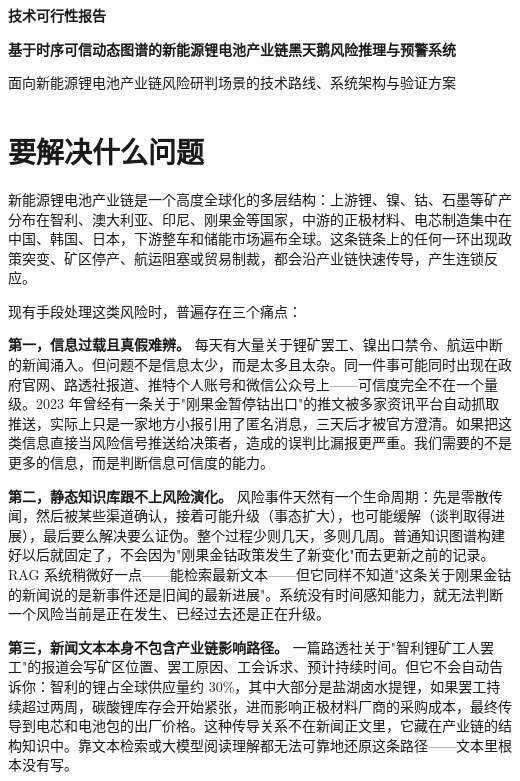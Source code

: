 \documentclass[12pt,a4paper]{ctexart}
\begin{document}
\begin{center}
    \vspace*{0.8cm}
    {\bfseries 技术可行性报告\par}
    \vspace{0.8cm}
    {\bfseries 基于时序可信动态图谱的新能源锂电池产业链黑天鹅风险推理与预警系统\par}
    \vspace{0.5cm}
    { 面向新能源锂电池产业链风险研判场景的技术路线、系统架构与验证方案\par}
\end{center}

\vspace{0.6cm}

\section{要解决什么问题}

新能源锂电池产业链是一个高度全球化的多层结构：上游锂、镍、钴、石墨等矿产分布在智利、澳大利亚、印尼、刚果金等国家，中游的正极材料、电芯制造集中在中国、韩国、日本，下游整车和储能市场遍布全球。这条链条上的任何一环出现政策突变、矿区停产、航运阻塞或贸易制裁，都会沿产业链快速传导，产生连锁反应。

现有手段处理这类风险时，普遍存在三个痛点：

\textbf{第一，信息过载且真假难辨。} 每天有大量关于锂矿罢工、镍出口禁令、航运中断的新闻涌入。但问题不是信息太少，而是太多且太杂。同一件事可能同时出现在政府官网、路透社报道、推特个人账号和微信公众号上——可信度完全不在一个量级。2023 年曾经有一条关于"刚果金暂停钴出口"的推文被多家资讯平台自动抓取推送，实际上只是一家地方小报引用了匿名消息，三天后才被官方澄清。如果把这类信息直接当风险信号推送给决策者，造成的误判比漏报更严重。我们需要的不是更多的信息，而是判断信息可信度的能力。

\textbf{第二，静态知识库跟不上风险演化。} 风险事件天然有一个生命周期：先是零散传闻，然后被某些渠道确认，接着可能升级（事态扩大），也可能缓解（谈判取得进展），最后要么解决要么证伪。整个过程少则几天，多则几周。普通知识图谱构建好以后就固定了，不会因为"刚果金钴政策发生了新变化"而去更新之前的记录。RAG 系统稍微好一点——能检索最新文本——但它同样不知道"这条关于刚果金钴的新闻说的是新事件还是旧闻的最新进展"。系统没有时间感知能力，就无法判断一个风险当前是正在发生、已经过去还是正在升级。

\textbf{第三，新闻文本本身不包含产业链影响路径。} 一篇路透社关于"智利锂矿工人罢工"的报道会写矿区位置、罢工原因、工会诉求、预计持续时间。但它不会自动告诉你：智利的锂占全球供应量约 30\%，其中大部分是盐湖卤水提锂，如果罢工持续超过两周，碳酸锂库存会开始紧张，进而影响正极材料厂商的采购成本，最终传导到电芯和电池包的出厂价格。这种传导关系不在新闻正文里，它藏在产业链的结构知识中。靠文本检索或大模型阅读理解都无法可靠地还原这条路径——文本里根本没有写。
\end{document}
